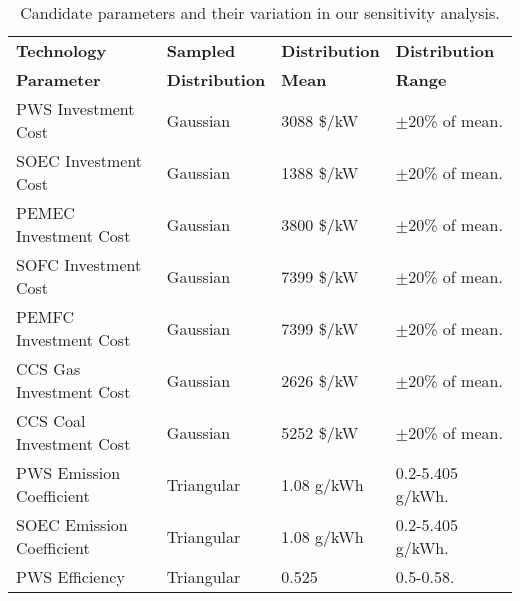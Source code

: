 \begin{table}[!ht]
	\caption{Candidate parameters and their variation in our sensitivity analysis.}
	\vspace{0.1in}
	\begin{tabularx}{0.9\textwidth}{p{} p{} p{}p{}}
\hline 
\textbf{Technology}  & \textbf{Sampled} & \textbf{Distribution}& \textbf{Distribution}\\
\textbf{Parameter} & \textbf{Distribution} & \textbf{Mean}& \textbf{Range}\\
\hline
\gls{PWS} Investment Cost       & Gaussian    & 3088 \$/kW & $\pm$20\% of mean. \\                  
\gls{SOEC} Investment Cost      & Gaussian    & 1388 \$/kW & $\pm$20\% of mean.\\                  
\gls{PEMEC} Investment Cost     & Gaussian    & 3800 \$/kW & $\pm$20\% of mean.\\                  
\gls{SOFC} Investment Cost      & Gaussian    & 7399 \$/kW & $\pm$20\% of mean.\\                  
\gls{PEMFC} Investment Cost     & Gaussian    & 7399 \$/kW & $\pm$20\% of mean.\\                  
\gls{CCS} Gas Investment Cost   & Gaussian    & 2626 \$/kW & $\pm$20\% of mean.\\                  
\gls{CCS} Coal Investment Cost  & Gaussian    & 5252 \$/kW & $\pm$20\% of mean.\\
\gls{PWS} Emission Coefficient  & Triangular  & 1.08 g/kWh & 0.2-5.405 g/kWh. \\                  
\gls{SOEC} Emission Coefficient & Triangular  & 1.08 g/kWh & 0.2-5.405 g/kWh. \\
\gls{PWS} Efficiency            & Triangular  & 0.525 & 0.5-0.58. \\                               
\hline
	\end{tabularx}
\label{sa-vars}
\end{table}